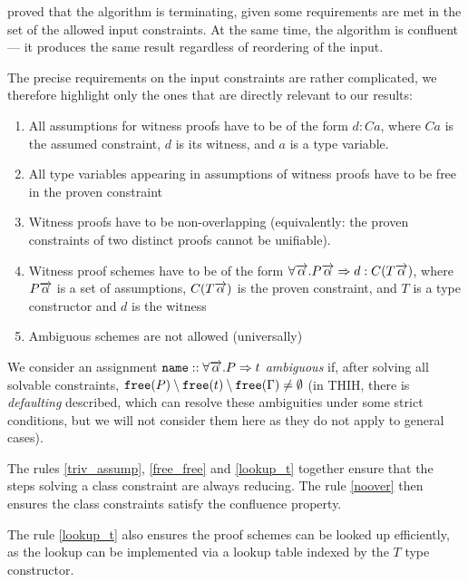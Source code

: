 \citet{vytiniotis2011outsidein} proved that the algorithm is terminating, given some requirements are met in the set of the allowed input constraints. At the same time, the algorithm is confluent --- it produces the same result regardless of reordering of the input.

The precise requirements on the input constraints are rather complicated, we therefore highlight only the ones that are directly relevant to our results:

\begin{enumerate}
    \item All assumptions for witness proofs have to be of the form $d : C a$, where $C a$ is the assumed constraint, $d$ is its witness, and $a$ is a type variable. \label{triv_assump}
    \item All type variables appearing in assumptions of witness proofs have to be free in the proven constraint \label{free_free}
    \item Witness proofs have to be non-overlapping (equivalently: the proven constraints of two distinct proofs cannot be unifiable). \label{noover}
    \item Witness proof schemes have to be of the form $\forall \overrightarrow{\alpha} . P \overrightarrow{\alpha} \Rightarrow d : C (T \overrightarrow{\alpha})$, where $P \overrightarrow{\alpha}$ is a set of assumptions, $C (T \overrightarrow{\alpha})$ is the proven constraint, and $T$ is a type constructor and $d$ is the witness \label{lookup_t}
    \item Ambiguous schemes are not allowed (universally) \label{ambi_rule}
\end{enumerate}

We consider an assignment $\mathtt{name} :: \forall \overrightarrow{\alpha} . P  \Rightarrow t$ \emph{ambiguous} if, after solving all solvable constraints, $\mathtt{free} (P) \setminus \mathtt{free} (t) \setminus \mathtt{free} (\Gamma) \neq \emptyset$ (in THIH, there is \emph{defaulting} described, which can resolve these ambiguities under some strict conditions, but we will not consider them here as they do not apply to general cases).

The rules \ref{triv_assump}, \ref{free_free} and \ref{lookup_t} together ensure that the steps solving a class constraint are always reducing. The rule \ref{noover} then ensures the class constraints satisfy the confluence property.

The rule \ref{lookup_t} also ensures the proof schemes can be looked up efficiently, as the lookup can be implemented via a lookup table indexed by the $T$ type constructor.

